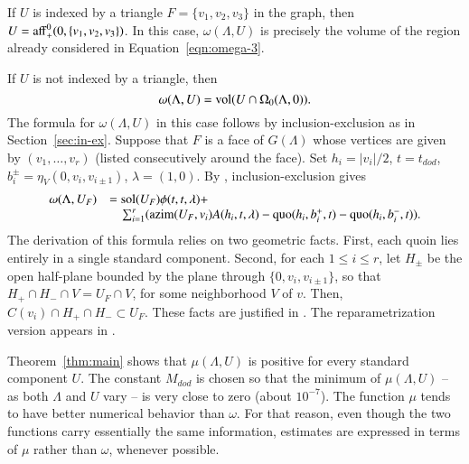 If $U$ is indexed by a triangle $F=\{v_1,v_2,v_3\}$ in the graph,
then $U = {\operatorname{aff}}_+^0(0,\{v_1,v_2,v_3\})$.  In this case,
$\omega(\Lambda,U)$ is precisely the volume of the region
already considered in Equation~\ref{eqn:omega-3}.

If $U$ is not indexed by a triangle, then
   $$\omega(\Lambda,U) = {\operatorname{vol}}(U\cap\Omega_0(\Lambda,0)).$$
The formula for $\omega(\Lambda,U)$ in this case follows
by inclusion-exclusion as in Section~\ref{sec:in-ex}.  Suppose
that $F$ is a face of $G(\Lambda)$ whose vertices are given
by $(v_1,\ldots,v_r)$ (listed consecutively around the face).
Set $h_i=|v_i|/2$, $t=t_{dod}$, $b^\pm_{i}=\eta_V(0,v_i,v_{i\pm 1})$,
$\lambda=(1,0)$.
By \cite[Eqn.~7.12]{DCG}, inclusion-exclusion gives
\begin{equation}\label{eqn:in-ex-U}
\begin{array}{lll}
\omega(\Lambda,U_F) &= \operatorname{sol}(U_F) \phi(t,t,\lambda) + \\
&\quad \sum_{i=1}^r ({\operatorname{azim}}(U_F,v_i) A(h_i,t,\lambda) - \operatorname{quo}(h_i,b_i^+,t) - 
\operatorname{quo}(h_i,b_i^-,t)).
\end{array}
\end{equation}
The derivation of this formula relies on two geometric facts.  First,
each quoin lies entirely in a single standard component.
Second, for each $1\le i\le r$, let $H_{\pm}$ be the open half-plane
bounded by the plane through $\{0,v_i,v_{i\pm 1}\}$, so
that $H_+\cap H_- \cap V = U_F\cap V$, for some neighborhood $V$ of $v$.
Then,   $C(v_i)\cap H_+\cap H_-\subset U_F$.
These facts are justified in \cite[Lemma~12.5]{DCG}.  The reparametrization
version appears in \cite{arx}.

Theorem~\ref{thm:main} shows that $\mu(\Lambda,U)$ is positive
for every standard component $U$.  The constant
$M_{dod}$ is chosen so that the minimum of $\mu(\Lambda,U)$ -- as
both $\Lambda$ and $U$  vary -- is very close to zero (about $10^{-7}$).
The function $\mu$ tends to have better numerical behavior
than $\omega$.  For that reason, even though the two
functions carry essentially the same information,
estimates are expressed in terms
of $\mu$ rather than $\omega$, whenever possible.

